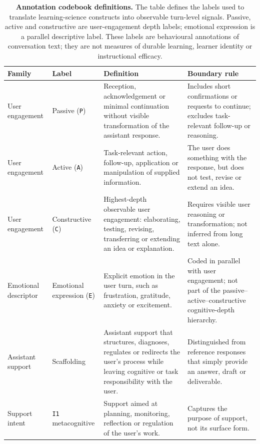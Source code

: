 \begin{table}[t]
\fontsize{6.8pt}{7.5pt}\selectfont
\centering
\caption{\textbf{Annotation codebook definitions.} The table defines the labels used to translate learning-science constructs into observable turn-level signals. Passive, active and constructive are user-engagement depth labels; emotional expression is a parallel descriptive label. These labels are behavioural annotations of conversation text; they are not measures of durable learning, learner identity or instructional efficacy.}
\label{tab:annotation_codebook_definitions}
\setlength{\tabcolsep}{3pt}
\renewcommand{\arraystretch}{1.02}
\begin{tabularx}{\textwidth}{
>{\raggedright\arraybackslash}p{}
>{\raggedright\arraybackslash}p{}
>{\raggedright\arraybackslash}p{}
>{\raggedright\arraybackslash}X}
\toprule
Family & Label & Definition & Boundary rule \\
\midrule
User engagement & Passive (\texttt{P}) & Reception, acknowledgement or minimal continuation without visible transformation of the assistant response. & Includes short confirmations or requests to continue; excludes task-relevant follow-up or reasoning. \\
User engagement & Active (\texttt{A}) & Task-relevant action, follow-up, application or manipulation of supplied information. & The user does something with the response, but does not test, revise or extend an idea. \\
User engagement & Constructive (\texttt{C}) & Highest-depth observable user engagement: elaborating, testing, revising, transferring or extending an idea or explanation. & Requires visible user reasoning or transformation; not inferred from long text alone. \\
Emotional descriptor & Emotional expression (\texttt{E}) & Explicit emotion in the user turn, such as frustration, gratitude, anxiety or excitement. & Coded in parallel with user engagement; not part of the passive--active--constructive cognitive-depth hierarchy. \\
\midrule
Assistant support & Scaffolding & Assistant support that structures, diagnoses, regulates or redirects the user's process while leaving cognitive or task responsibility with the user. & Distinguished from reference responses that simply provide an answer, draft or deliverable. \\
Support intent & \texttt{I1} metacognitive & Support aimed at planning, monitoring, reflection or regulation of the user's work. & Captures the purpose of support, not its surface form. \\

\end{tabularx}
\end{table}
